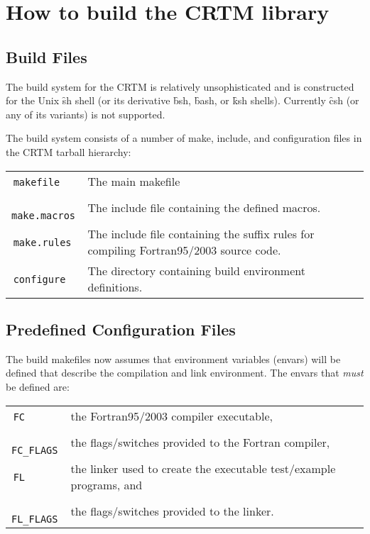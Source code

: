\chapter{How to build the CRTM library}
\label{chapter:build}

\section{Build Files}
The build system for the CRTM is relatively unsophisticated and is constructed for the Unix \f{sh} shell (or its derivative \f{bsh}, \f{bash}, or \f{ksh} shells). Currently \f{csh} (or any of its variants) is not supported.

The build system consists of a number of make, include, and configuration files in the CRTM tarball hierarchy:

\begin{tabular}{l@{ : }p{4.75in}}
  \,\texttt{makefile} & The main makefile\\
  \,\texttt{make.macros} & The include file containing the defined macros.\\
  \,\texttt{make.rules} & The include file containing the suffix rules for compiling Fortran95/2003 source code.\\
  \,\texttt{configure} & The directory containing build environment definitions.\\
\end{tabular}

\section{Predefined Configuration Files}
The build makefiles now assumes that environment variables (envars) will be defined that describe the compilation and link environment. The envars that \emph{must} be defined are:

\begin{tabular}{l@{ : }p{4.75in}}
  \,\texttt{FC}        & the Fortran95/2003 compiler executable,\\
  \,\texttt{FC\_FLAGS} & the flags/switches provided to the Fortran compiler,\\
  \,\texttt{FL}        & the linker used to create the executable test/example programs, and\\
  \,\texttt{FL\_FLAGS} & the flags/switches provided to the linker.\\
\end{tabular}
  
